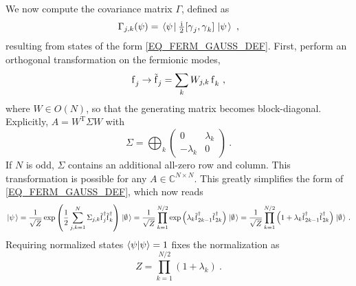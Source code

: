 \documentclass[letter]{article}
\begin{document}
We now compute the covariance matrix $\Gamma$, defined as
\begin{equation}
\Gamma_{j,k}(\psi) =\left.\left\langle{\psi}\right.\right|\tfrac{\,\mathrm{i}\,}{2} [\operatorname{\gamma}_j,\operatorname{\gamma}_k]\left.\left|{\psi}\right.\right\rangle \ ,
\end{equation}
resulting from states of the form \eqref{EQ_FERM_GAUSS_DEF}.
First, perform an orthogonal transformation on the fermionic modes,
\begin{equation}
\fe_j \to \ft_j = \sum_k W_{j,k} \fe_k \ ,
\end{equation} 
where $W \in O(N)$, so that the generating matrix becomes block-diagonal. Explicitly, $A = W^\mathrm{T} \Sigma W$ with
\begin{equation}
\Sigma = 
\bigoplus_k
\begin{pmatrix}
0 & \lambda_k \\
-\lambda_k & 0
\end{pmatrix}\ .
\end{equation}
If $N$ is odd, $\Sigma$ contains an additional all-zero row and column.
This transformation is possible for any $A \in \mathbb{C}^{N \times N}$. This greatly simplifies the form of \eqref{EQ_FERM_GAUSS_DEF}, which now reads
\begin{equation}
\left.\left|{\psi}\right.\right\rangle = \frac{1}{\sqrt{Z}} \exp\left( \frac{1}{2} \sum_{j,k=1}^N \Sigma_{j,k} \tilde{\operatorname{f}}^\dagger_j \tilde{\operatorname{f}}^\dagger_k \right) {\left.\left|{\emptyset}\right.\right\rangle} 
= \frac{1}{\sqrt{Z}} \prod_{k=1}^{N/2} \exp\left(\lambda_k \tilde{\operatorname{f}}^\dagger_{2k-1} \tilde{\operatorname{f}}^\dagger_{2k}\right) {\left.\left|{\emptyset}\right.\right\rangle}
= \frac{1}{\sqrt{Z}} \prod_{k=1}^{N/2} \left(1 + \lambda_k \tilde{\operatorname{f}}^\dagger_{2k-1} \tilde{\operatorname{f}}^\dagger_{2k}\right) {\left.\left|{\emptyset}\right.\right\rangle}
\ .
\end{equation}
Requiring normalized states $\left\langle \psi \middle| \psi \right\rangle = 1$ fixes the normalization as
\begin{equation}
Z = \prod_{k=1}^{N/2} \left(1 + \lambda_k\right)\ .
\end{equation}
\end{document}
